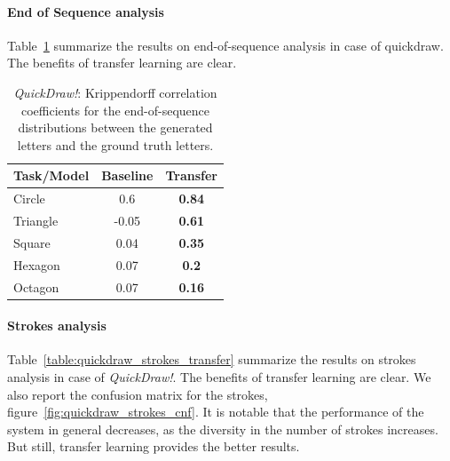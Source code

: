       \paragraph{End of Sequence analysis}
        Table~\ref{table:quickdraw_eos_transfer} summarize the results on end-of-sequence analysis in case of quickdraw. The benefits of transfer learning are clear.
        \begin{table}[!htbp]
          \centering
          \begin{tabular}{l c c} \hline

          Task/Model & Baseline & Transfer \\ \hline
          Circle &  0.6 & \textbf{0.84} \\ %
          Triangle & -0.05 & \textbf{0.61} \\ %
          Square &  0.04 &  \textbf{0.35} \\ %
          Hexagon &  0.07 &  \textbf{0.2} \\ %
          Octagon &  0.07 &  \textbf{0.16} \\ \hline

          \end{tabular}
          \caption{\textit{QuickDraw!}: Krippendorff correlation coefficients for the end-of-sequence distributions between the generated letters and the ground truth letters.}
          \label{table:quickdraw_eos_transfer}
        \end{table}

      \paragraph{Strokes analysis}
        Table~\ref{table:quickdraw_strokes_transfer} summarize the results on strokes analysis in case of \textit{QuickDraw!}. The benefits of transfer learning are clear. We also report the confusion matrix for the strokes, figure~\ref{fig:quickdraw_strokes_cnf}. It is notable that the performance of the system in general decreases, as the diversity in the number of strokes increases. But still, transfer learning provides the better results.

